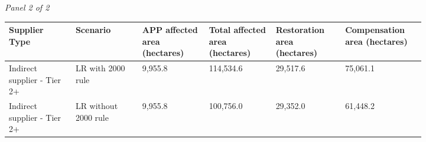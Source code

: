 \documentclass[12pt]{article}
\begin{document}
\begin{landscape}
\begin{table}[H]
\textit{Panel 2 of 2}\\[2pt]
{\fontsize{12}{14}\selectfont
\setlength{\tabcolsep}{3pt}
\renewcommand{\arraystretch}{1.08}
\begin{tabular}{p{0.137\linewidth}p{0.137\linewidth}p{0.137\linewidth}p{0.137\linewidth}p{0.137\linewidth}p{0.137\linewidth}}
\toprule
Supplier Type & Scenario & APP affected area (hectares) & Total affected area (hectares) & Restoration area (hectares) & Compensation area (hectares) \\
\midrule
Indirect supplier - Tier 2+ & LR with 2000 rule & 9,955.8 & 114,534.6 & 29,517.6 & 75,061.1 \\
Indirect supplier - Tier 2+ & LR without 2000 rule & 9,955.8 & 100,756.0 & 29,352.0 & 61,448.2 \\
\bottomrule
\end{tabular}
}
\end{table}
\end{landscape}
\end{document}

